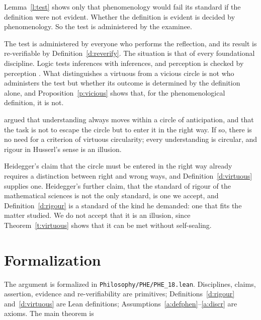 \documentclass{situationist-preprint}
\begin{document}
\begin{objection}
Lemma~\ref{l:test} shows only that phenomenology would fail its standard if the definition were not evident. Whether the definition is evident is decided by phenomenology. So the test is administered by the examinee.
\end{objection}

\begin{reply}
The test is administered by everyone who performs the reflection, and its result is re-verifiable by Definition~\ref{d:reverify}. The situation is that of every foundational discipline. Logic tests inferences with inferences, and perception is checked by perception \citep{Alston1986}. What distinguishes a virtuous from a vicious circle is not who administers the test but whether its outcome is determined by the definition alone, and Proposition~\ref{p:vicious} shows that, for the phenomenological definition, it is not.
\end{reply}

\begin{objection}
\citet[§32]{Heidegger1927} argued that understanding always moves within a circle of anticipation, and that the task is not to escape the circle but to enter it in the right way. If so, there is no need for a criterion of virtuous circularity; every understanding is circular, and rigour in Husserl's sense is an illusion.
\end{objection}

\begin{reply}
Heidegger's claim that the circle must be entered in the right way already requires a distinction between right and wrong ways, and Definition~\ref{d:virtuous} supplies one. Heidegger's further claim, that the standard of rigour of the mathematical sciences is not the only standard, is one we accept, and Definition~\ref{d:rigour} is a standard of the kind he demanded: one that fits the matter studied. We do not accept that it is an illusion, since Theorem~\ref{t:virtuous} shows that it can be met without self-sealing.
\end{reply}

\section{Formalization}

The argument is formalized in \nolinkurl{Philosophy/PHE/PHE_18.lean}. Disciplines, claims, assertion, evidence and re-verifiability are primitives; Definitions~\ref{d:rigour} and~\ref{d:virtuous} are Lean definitions; Assumptions~\ref{a:defphen}--\ref{a:discr} are axioms. The main theorem is
\end{document}
